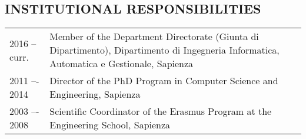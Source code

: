 \vspace{-1ex}
\subsection*{INSTITUTIONAL RESPONSIBILITIES}
\vspace{-1ex}
\begin{tabular}{p{2cm}p{14cm}}
2016 -- curr. & Member of the Department Directorate (Giunta di Dipartimento), Dipartimento di Ingegneria Informatica, Automatica e Gestionale, Sapienza\\
2011 –- 2014 & Director of the PhD Program in Computer Science and Engineering, Sapienza\\
2003 –- 2008 & Scientific Coordinator of the  Erasmus Program at the Engineering School, Sapienza
\end{tabular}

\vspace{-1ex}
